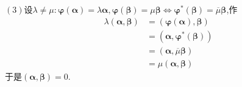 \begin{green}
\begin{Proof}
        $(3)$设$\lambda\neq\mu:\bm{\varphi}\left(\bm{\alpha}\right)=\lambda\bm{\alpha},\bm{\varphi}\left(\bm{\beta}\right)=\mu\bm{\beta}\Longleftrightarrow\bm{\varphi}^*\left(\bm{\beta}\right)=\overline{\mu}\bm{\beta}$,作\begin{align*}
            \lambda\left(
                \bm{\alpha},\bm{\beta}
            \right)&=\left(
                \bm{\varphi}\left(\bm{\alpha}\right),\bm{\beta}
            \right)\\
            &=\left(
                \bm{\alpha},\bm{\varphi}^*\left(\bm{\beta}\right)
            \right)\\
            &=\left(
                \bm{\alpha},\overline{\mu}\bm{\beta}
            \right)\\
            &=\mu\left(
                \bm{\alpha},\bm{\beta}
            \right)
        \end{align*}于是$\left(
            \bm{\alpha},\bm{\beta}
        \right)=0.$
    \end{Proof}
\end{green}
